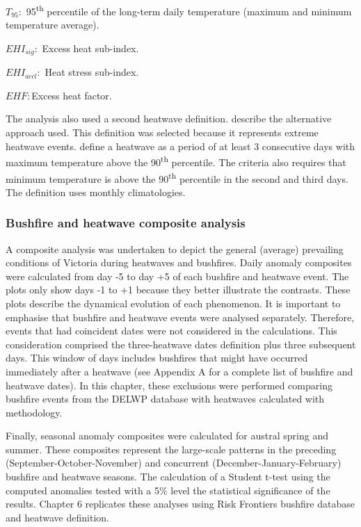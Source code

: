 $T_{95}:$ 95\textsuperscript{th} percentile of the long-term daily
temperature (maximum and minimum temperature average).

$EHI_{sig}:$ Excess heat sub-index.

$EHI_{accl}:$ Heat stress sub-index.

$EHF:$Excess heat factor.

The analysis also used a second heatwave definition. \citet{Pezza2012}
describe the alternative approach used. This definition was selected
because it represents extreme heatwave events. \citet{Pezza2012}
define a heatwave as a period of at least 3 consecutive days with
maximum temperature above the 90\textsuperscript{th} percentile.
The criteria also requires that minimum temperature is above the 90\textsuperscript{th}
percentile in the second and third days. The definition uses monthly
climatologies. 


\subsubsection{Bushfire and heatwave composite analysis}

A composite analysis was undertaken to depict the general (average)
prevailing conditions of Victoria during heatwaves and bushfires. 
Daily anomaly composites were calculated from day -5 to day +5 of
each bushfire and heatwave event. The plots only show days -1 to +1 because they better illustrate the
contrasts. These plots describe the dynamical evolution of each phenomenon.
It is important to emphasise that bushfire and heatwave events were
analysed separately. Therefore, events that had coincident dates were
not considered in the calculations. This consideration comprised the
three-heatwave dates definition plus three subsequent days. This window
of days includes bushfires that might have occurred immediately after
a heatwave (see Appendix A for a complete list of bushfire and heatwave
dates). In this chapter, these exclusions were performed comparing
bushfire events from the DELWP database with heatwaves calculated
with \citet{Nairn2009} methodology. 

Finally, seasonal anomaly composites were calculated for austral spring
and summer. These composites represent the large-scale patterns in
the preceding (September-October-November) and concurrent (December-January-February)
bushfire and heatwave seasons. The calculation of a Student t-test
using the computed anomalies tested with a 5\% level the statistical
significance of the results. Chapter 6 replicates these analyses using
Risk Frontiers bushfire database and \citet{Pezza2012} heatwave definition. 


